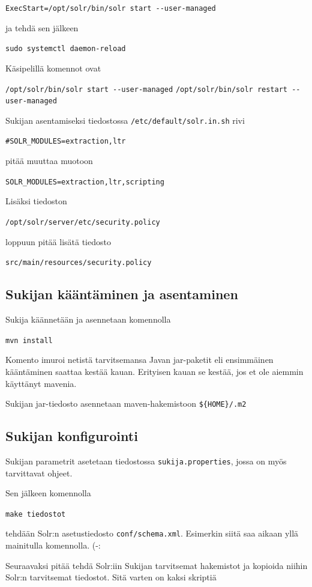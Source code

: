 \documentclass[12pt]{article}
\begin{document}
\verb|ExecStart=/opt/solr/bin/solr start --user-managed|

ja tehdä sen jälkeen

\verb|sudo systemctl daemon-reload|


\bigskip
Käsipelillä komennot ovat

\verb|/opt/solr/bin/solr start --user-managed|
\verb|/opt/solr/bin/solr restart --user-managed|


\newpage
Sukijan asentamiseksi tiedostossa \verb|/etc/default/solr.in.sh|
rivi

\verb|#SOLR_MODULES=extraction,ltr|

pitää muuttaa muotoon

\verb|SOLR_MODULES=extraction,ltr,scripting|


\bigskip
Lisäksi tiedoston

\verb|/opt/solr/server/etc/security.policy|

loppuun pitää lisätä tiedosto

\verb|src/main/resources/security.policy|


\newpage
\subsection*{Sukijan kääntäminen ja asentaminen}

Sukija käännetään ja asennetaan komennolla

\verb=mvn install=

Komento imuroi netistä tarvitsemansa Javan jar-paketit eli ensimmäinen
kääntäminen saattaa kestää kauan. Erityisen kauan se kestää, jos et
ole aiemmin käyttänyt mavenia.

Sukijan jar-tiedosto asennetaan maven-hakemistoon \verb|${HOME}/.m2|


\subsection*{Sukijan konfigurointi}

Sukijan parametrit asetetaan tiedostossa \verb|sukija.properties|,
jossa on myös tarvittavat ohjeet.

Sen jälkeen komennolla

\verb|make tiedostot|

tehdään Solr:n asetustiedosto \verb=conf/schema.xml=. Esimerkin siitä
saa aikaan yllä mainitulla komennolla. (-:

Seuraavaksi pitää tehdä Solr:iin Sukijan tarvitsemat hakemistot ja
kopioida niihin Solr:n tarvitsemat tiedostot. Sitä varten on kaksi
skriptiä
\end{document}
